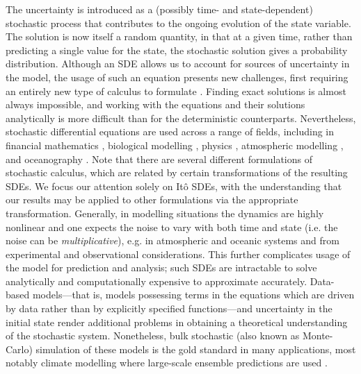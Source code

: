 The uncertainty is introduced as a (possibly time- and state-dependent) stochastic process that contributes to the ongoing evolution of the state variable.
The solution is now itself a random quantity, in that at a given time, rather than predicting a single value for the state, the stochastic solution gives a probability distribution.
Although an SDE allows us to account for sources of uncertainty in the model, the usage of such an equation presents new challenges, first requiring an entirely new type of calculus to formulate \citep{Ito_1944_StochasticIntegral,Ito_1946_StochasticIntegralEquation}.
Finding exact solutions is almost always impossible, and working with the equations and their solutions analytically is more difficult than for the deterministic counterparts.
Nevertheless, stochastic differential equations are used across a range of fields, including in financial mathematics \citehere, biological modelling \citep[e.g.]{PreislerEtAl_2004_ModelingAnimalMovements,another}, physics \citep[e.g.]{StraussEffenberger_2017_HitchhikerGuideStochastic,GardinerEtAl_1992_WavefunctionQuantumStochastic,another}, atmospheric modelling \citehere, and oceanography \citep{BerloffMcWilliams_2002_MaterialTransportOceanic}.
Note that there are several different formulations of stochastic calculus, which are related by certain transformations of the resulting SDEs.
We focus our attention solely on It\^o SDEs, with the understanding that our results may be applied to other formulations via the appropriate transformation.
Generally, in modelling situations the dynamics are highly nonlinear and one expects the noise to vary with both time and state (i.e. the noise can be \emph{multiplicative}), e.g. in atmospheric \citep{SuraEtAl_2005_MultiplicativeNoiseNonGaussianity,Sura_2003_StochasticAnalysisSouthern} and oceanic \citep{KamenkovichEtAl_2015_PropertiesOriginsAnisotropic} systems and from experimental and observational considerations.
This further complicates usage of the model for prediction and analysis; such SDEs are intractable to solve analytically and computationally expensive to approximate accurately.
Data-based models---that is, models possessing terms in the equations which are driven by data rather than by explicitly specified functions---and uncertainty in the initial state render additional problems in obtaining a theoretical understanding of the stochastic system.
Nonetheless, bulk stochastic (also known as Monte-Carlo) simulation of these models is the gold standard in many applications, most notably climate modelling where large-scale ensemble predictions are used \citep{Collins_2007_EnsemblesProbabilitiesNew,LeutbecherEtAl_2017_StochasticRepresentationsModel}.

